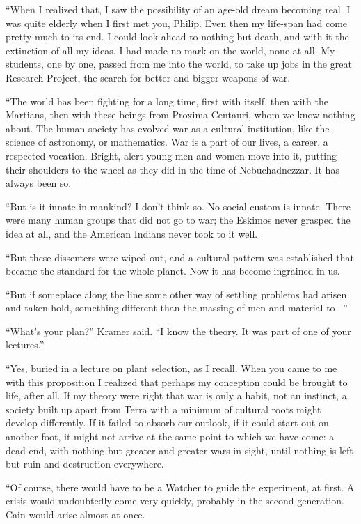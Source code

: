 \documentclass[12pt,a5paper]{book}
\begin{document}
“When I realized that, I saw the possibility of an age-old dream becoming real. I was quite elderly when I first met you, Philip. Even then my life-span had come pretty much to its end. I could look ahead to nothing but death, and with it the extinction of all my ideas. I had made no mark on the world, none at all. My students, one by one, passed from me into the world, to take up jobs in the great Research Project, the search for better and bigger weapons of war.

“The world has been fighting for a long time, first with itself, then with the Martians, then with these beings from Proxima Centauri, whom we know nothing about. The human society has evolved war as a cultural institution, like the science of astronomy, or mathematics. War is a part of our lives, a career, a respected vocation. Bright, alert young men and women move into it, putting their shoulders to the wheel as they did in the time of Nebuchadnezzar. It has always been so.

“But is it innate in mankind? I don't think so. No social custom is innate. There were many human groups that did not go to war; the Eskimos never grasped the idea at all, and the American Indians never took to it well.

“But these dissenters were wiped out, and a cultural pattern was established that became the standard for the whole planet. Now it has become ingrained in us.

“But if someplace along the line some other way of settling problems had arisen and taken hold, something different than the massing of men and material to –”

“What's your plan?” Kramer said. “I know the theory. It was part of one of your lectures.”

“Yes, buried in a lecture on plant selection, as I recall. When you came to me with this proposition I realized that perhaps my conception could be brought to life, after all. If my theory were right that war is only a habit, not an instinct, a society built up apart from Terra with a minimum of cultural roots might develop differently. If it failed to absorb our outlook, if it could start out on another foot, it might not arrive at the same point to which we have come: a dead end, with nothing but greater and greater wars in sight, until nothing is left but ruin and destruction everywhere.

“Of course, there would have to be a Watcher to guide the experiment, at first. A crisis would undoubtedly come very quickly, probably in the second generation. Cain would arise almost at once.
\end{document}
